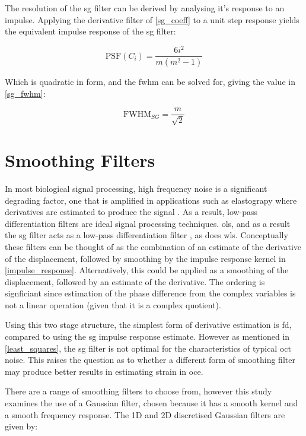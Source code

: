 The resolution of the \ac{sg} filter can be derived by analysing it's response to an impulse. Applying the derivative filter of \autoref{sg_coeff} to a unit step response yields the equivalent impulse response of the \ac{sg} filter:

\begin{equation}
	\text{PSF} (C_i)=\frac{6 i^2}{m(m^2-1)}
	\label{impulse_response}
\end{equation}

Which is quadratic in form, and the \ac{fwhm} can be solved for, giving the value in \autoref{sg_fwhm}:

\begin{equation}
	\label{sg_fwhm}
	\text{FWHM}_{SG} = \frac{m}{\sqrt{2}}
\end{equation}

\section{Smoothing Filters}
In most biological signal processing, high frequency noise is a significant degrading factor, one that is amplified in applications such as elastograpy where derivatives are estimated to produce the signal \cite{usui_digital_1982}. As a result, low-pass differentiation filters are ideal signal processing techniques. \ac{ols}, and as a result the \ac{sg} filter acts as a low-pass differentiation filter \cite{luo_axial_2004}, as does \ac{wls}.
Conceptually these filters can be thought of as the combination of an estimate of the derivative of the displacement, followed by smoothing by the impulse response kernel in \ref{impulse_response}. Alternatively, this could be applied as a smoothing of the displacement, followed by an estimate of the derivative. The ordering is signficiant since estimation of the phase difference from the complex variables is not a linear operation (given that it is a complex quotient).

Using this two stage structure, the simplest form of derivative estimation is \ac{fd}, compared to using the \ac{sg} impulse response estimate. However as mentioned in \autoref{least_squares}, the \ac{sg} filter is not optimal for the characteristics of typical \ac{oct} noise.
This raises the question as to whether a different form of smoothing filter may produce better results in estimating strain in \ac{oce}. 

There are a range of smoothing filters to choose from, however this study examines the use of a Gaussian filter, chosen because it has a smooth kernel and a smooth frequency response. The 1D and 2D discretised Gaussian filters are given by:

